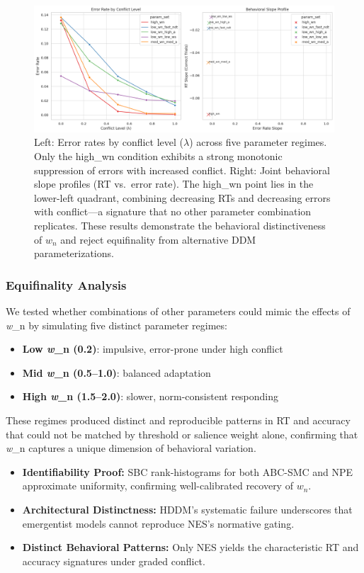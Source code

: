 \documentclass[
  11pt,
]{article}
\providecommand{\tightlist}{%
  \setlength{\itemsep}{0pt}\setlength{\parskip}{0pt}}
\begin{document}
\begin{figure}
\centering
\includegraphics[width=0.8\linewidth,height=\textheight,keepaspectratio]{figures/Error_Rate_by_Conflict_level.png}
\caption{Left: Error rates by conflict level (\(\lambda\)) across five
parameter regimes. Only the high\_wn condition exhibits a strong
monotonic suppression of errors with increased conflict. Right: Joint
behavioral slope profiles (RT vs.~error rate). The high\_wn point lies
in the lower-left quadrant, combining decreasing RTs and decreasing
errors with conflict---a signature that no other parameter combination
replicates. These results demonstrate the behavioral distinctiveness of
\(w_n\) and reject equifinality from alternative DDM
parameterizations.}\label{fig:error_rates}
\end{figure}

\subsubsection{Equifinality Analysis}\label{equifinality-analysis}

We tested whether combinations of other parameters could mimic the
effects of \emph{w}\_n by simulating five distinct parameter regimes:

\begin{itemize}
\tightlist
\item
  \textbf{Low \emph{w}\_n (0.2)}: impulsive, error-prone under high
  conflict
\item
  \textbf{Mid \emph{w}\_n (0.5--1.0)}: balanced adaptation
\item
  \textbf{High \emph{w}\_n (1.5--2.0)}: slower, norm-consistent
  responding
\end{itemize}

These regimes produced distinct and reproducible patterns in RT and
accuracy that could not be matched by threshold or salience weight
alone, confirming that \emph{w}\_n captures a unique dimension of
behavioral variation.

\begin{itemize}
\tightlist
\item
  \textbf{Identifiability Proof:} SBC rank‐histograms for both ABC-SMC
  and NPE approximate uniformity, confirming well-calibrated recovery of
  \(w_n\).\\
\item
  \textbf{Architectural Distinctness:} HDDM's systematic failure
  underscores that emergentist models cannot reproduce NES's normative
  gating.\\
\item
  \textbf{Distinct Behavioral Patterns:} Only NES yields the
  characteristic RT and accuracy signatures under graded conflict.
\end{itemize}
\end{document}
